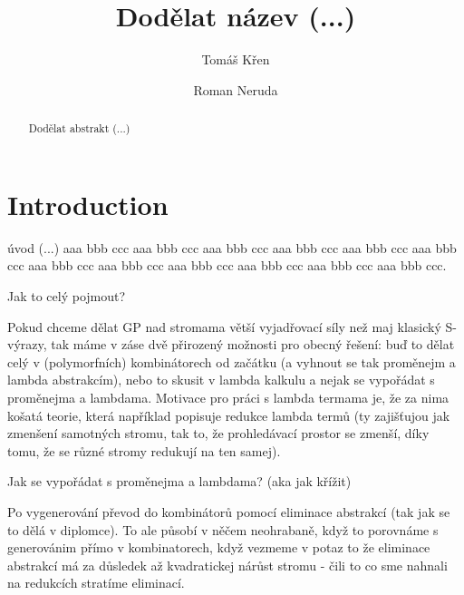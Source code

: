 \documentclass[conference]{IEEEtran}
\begin{document}
\title{\ \\ \LARGE\bf Dodělat název (...)}

\author{Tom\'{a}\v{s} K\v{r}en \and Roman Neruda}


\maketitle

\begin{abstract}
Dodělat abstrakt (...)
\end{abstract}

\section{Introduction}
 úvod (...) aaa bbb ccc aaa bbb ccc 
aaa bbb ccc aaa bbb ccc aaa bbb ccc aaa bbb ccc aaa bbb ccc aaa bbb ccc 
aaa bbb ccc aaa bbb ccc aaa bbb ccc aaa bbb ccc.

Jak to celý pojmout?

Pokud chceme dělat GP nad stromama větší vyjadřovací síly než maj klasický S-výrazy, tak máme v záse dvě přirozený možnosti pro obecný řešení: buď to dělat celý v (polymorfních) kombinátorech od začátku (a vyhnout se tak proměnejm a lambda abstrakcím), nebo to skusit v lambda kalkulu a nejak se vypořádat s proměnejma a lambdama. Motivace pro práci s lambda termama je, že za nima košatá teorie, která například popisuje redukce lambda termů (ty zajišťujou jak zmenšení samotných stromu, tak to, že prohledávací prostor se zmenší, díky tomu, že se různé stromy redukují na ten samej).

Jak se vypořádat s proměnejma a lambdama? (aka jak křížit)

Po vygenerování převod do kombinátorů pomocí eliminace abstrakcí (tak jak se to dělá v diplomce). To ale působí v něčem neohrabaně, když to porovnáme s generovánim přímo v kombinatorech, když vezmeme v potaz to že eliminace abstrakcí má za důsledek až kvadratickej nárůst stromu - čili to co sme nahnali na redukcích stratíme eliminací. 
\end{document}
